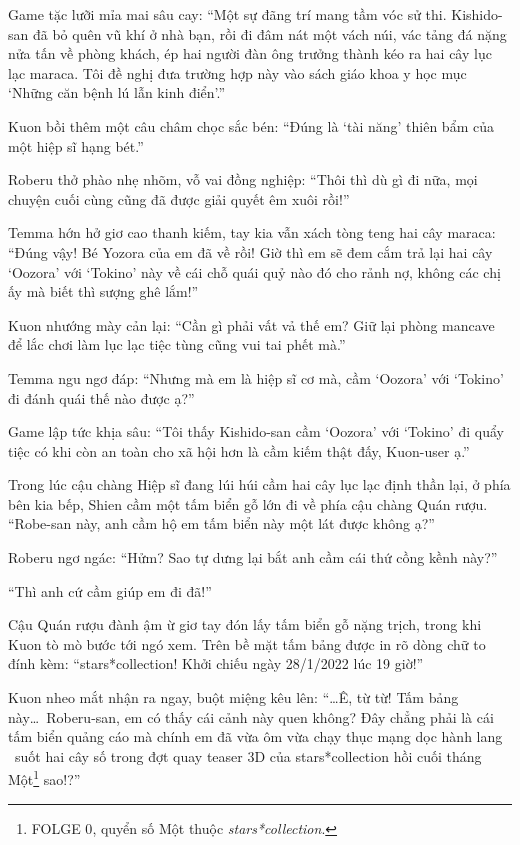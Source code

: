\documentclass[../main.tex]{subfiles}
\begin{document}
Game tặc lưỡi mỉa mai sâu cay: ``Một sự đãng trí mang tầm vóc sử thi. Kishido-san đã bỏ quên vũ khí ở nhà bạn, rồi đi đâm nát một vách núi, vác tảng đá nặng nửa tấn về phòng khách, ép hai người đàn ông trưởng thành kéo ra hai cây lục lạc maraca. Tôi đề nghị đưa trường hợp này vào sách giáo khoa y học mục `Những căn bệnh lú lẫn kinh điển'.''

Kuon bồi thêm một câu châm chọc sắc bén: ``Đúng là `tài năng' thiên bẩm của một hiệp sĩ hạng bét.''

Roberu thở phào nhẹ nhõm, vỗ vai đồng nghiệp: ``Thôi thì dù gì đi nữa, mọi chuyện cuối cùng cũng đã được giải quyết êm xuôi rồi!''

Temma hớn hở giơ cao thanh kiếm, tay kia vẫn xách tòng teng hai cây maraca: ``Đúng vậy! Bé Yozora của em đã về rồi! Giờ thì em sẽ đem cắm trả lại hai cây `Oozora' với `Tokino' này về cái chỗ quái quỷ nào đó cho rảnh nợ, không các chị ấy mà biết thì sượng ghê lắm!''

Kuon nhướng mày cản lại: ``Cần gì phải vất vả thế em? Giữ lại phòng mancave để lắc chơi làm lục lạc tiệc tùng cũng vui tai phết mà.''

Temma ngu ngơ đáp: ``Nhưng mà em là hiệp sĩ cơ mà, cầm `Oozora' với `Tokino' đi đánh quái thế nào được ạ?''

Game lập tức khịa sâu: ``Tôi thấy Kishido-san cầm `Oozora' với `Tokino' đi quẩy tiệc có khi còn an toàn cho xã hội hơn là cầm kiếm thật đấy, Kuon-user ạ.''

Trong lúc cậu chàng Hiệp sĩ đang lúi húi cầm hai cây lục lạc định thần lại, ở phía bên kia bếp, Shien cầm một tấm biển gỗ lớn đi về phía cậu chàng Quán rượu. ``Robe-san này, anh cầm hộ em tấm biển này một lát được không ạ?''


Roberu ngơ ngác: ``Hửm? Sao tự dưng lại bắt anh cầm cái thứ cồng kềnh này?''

``Thì anh cứ cầm giúp em đi đã!''

Cậu Quán rượu đành ậm ừ giơ tay đón lấy tấm biển gỗ nặng trịch, trong khi Kuon tò mò bước tới ngó xem. Trên bề mặt tấm bảng được in rõ dòng chữ to đính kèm: ``stars*collection! Khởi chiếu ngày 28/1/2022 lúc 19 giờ!''

Kuon nheo mắt nhận ra ngay, buột miệng kêu lên: ``\dots Ê, từ từ! Tấm bảng này\dots\ Roberu-san, em có thấy cái cảnh này quen không? Đây chẳng phải là cái tấm biển quảng cáo mà chính em đã vừa ôm vừa chạy thục mạng dọc hành lang \hll\ suốt hai cây số trong đợt quay teaser 3D của stars*collection hồi cuối tháng Một\footnote{{\humanist FOLGE 0}, quyển số Một thuộc \textit{stars*collection}.} sao!?''
\end{document}
